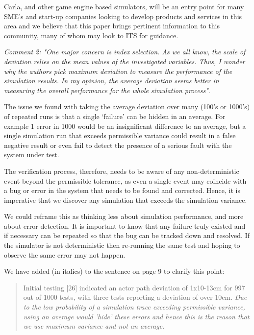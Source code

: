 \documentclass[11pt, a4paper]{letter} %
\begin{document}
\begin{letter}
Carla, and other game engine based simulators, will be an entry point for many SME's and start-up companies looking to develop products and services in this area and we believe that this paper brings pertinent information to this community, many of whom may look to ITS for guidance.


\bigskip

\textit{Comment 2: "One major concern is index selection. As we all know, the scale of deviation relies on the mean values of the investigated variables. Thus, I wonder why the authors pick maximum deviation to measure the performance of the simulation results. In my opinion, the average deviation seems better in measuring the overall performance for the whole simulation process"}.

The issue we found with taking the average deviation over many (100's or 1000's) of repeated runs is that a single `failure' can be hidden in an average. For example 1 error in 1000 would be an insignificant difference to an average, but a single simulation run that exceeds permissible variance could result in a false negative result or even fail to detect the presence of a serious fault with the system under test. 

The verification process, therefore, needs to be aware of any non-deterministic event beyond the permissible tolerance, as even a single event may coincide with a bug or error in the system that needs to be found and corrected. Hence, it is imperative that we discover any simulation that exceeds the simulation variance. 

We could reframe this as thinking less about simulation performance, and more about error detection. It is important to know that any failure truly existed and if necessary can be repeated so that the bug can be tracked down and resolved. If the simulator is not deterministic then re-running the same test and hoping to observe the same error may not happen.

We have added (in italics) to the sentence on page 9 to clarify this point:  
\begin{quote} 
Initial testing [26] indicated an actor path deviation of 1x10-13cm for 997 out of 1000 tests, with three tests reporting a deviation of over 10cm. \textit{Due to the low probability of a simulation trace exceeding permissible variance, using an average would 'hide' these errors and hence this is the reason that we use maximum variance and not an average}. 
\end{quote}


\end{letter}
\end{document}
